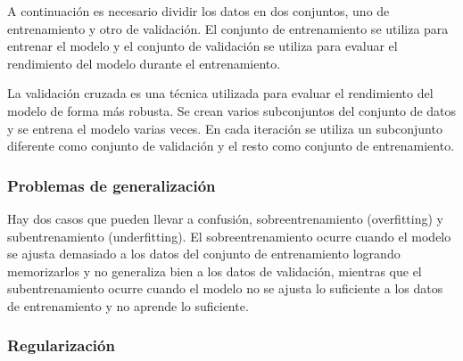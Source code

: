 A continuación es necesario dividir los datos en dos conjuntos, uno de entrenamiento y otro de validación.
El conjunto de entrenamiento se utiliza para entrenar el modelo y el conjunto de validación se utiliza para evaluar el rendimiento del modelo durante el entrenamiento.

La validación cruzada es una técnica utilizada para evaluar el rendimiento del modelo de forma más robusta.
Se crean varios subconjuntos del conjunto de datos y se entrena el modelo varias veces. En cada iteración se utiliza un subconjunto diferente como conjunto de validación y el resto como conjunto de entrenamiento.

\subsubsection{Problemas de generalización}

Hay dos casos que pueden llevar a confusión, sobreentrenamiento (overfitting) y subentrenamiento (underfitting).
El sobreentrenamiento ocurre cuando el modelo se ajusta demasiado a los datos del conjunto de entrenamiento logrando memorizarlos y no generaliza bien a los datos de validación, mientras que el subentrenamiento ocurre cuando el modelo no se ajusta lo suficiente a los datos de entrenamiento y no aprende lo suficiente.

\subsubsection{Regularización}


